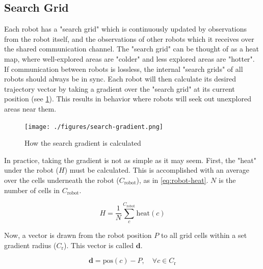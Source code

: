 
\subsection{Search Grid}

Each robot has a "search grid" which is continuously updated by observations from the robot itself, and the observations of other robots which it receives over the shared communication channel. The "search grid" can be thought of as a heat map, where well-explored areas are "colder" and less explored areas are "hotter". If communication between robots is lossless, the internal "search grids" of all robots should always be in sync. Each robot will then calculate its desired trajectory vector by taking a gradient over the "search grid" at its current position (see \cref{fig:search-gradient}). This results in behavior where robots will seek out unexplored areas near them. \\
\begin{figure}[h]
    \begin{center}
        \texttt{[image: ./figures/search-gradient.png]}
    \end{center}
    \caption{How the search gradient is calculated}
    \label{fig:search-gradient}
\end{figure}


In practice, taking the gradient is not as simple as it may seem. First, the "heat" under the robot ($H$) must be calculated. This is accomplished with an average over the cells underneath the robot ($C_\mathrm{robot}$), as in \cref{eq:robot-heat}. $N$ is the number of cells in $C_\mathrm{robot}$.

\begin{equation}
\label{eq:robot-heat}
    H = \frac{1}{N} \sum_c^{C_\mathrm{robot}} \mathrm{heat}(c)
\end{equation}

Now, a vector is drawn from the robot position $P$ to all grid cells within a set gradient radius ($C_\mathrm{r}$). This vector is called $\mathbf{d}$.

\begin{equation}
    \mathbf{d} = \mathrm{pos}(c) - P, \quad \forall c \in C_\mathrm{r}
\end{equation}

